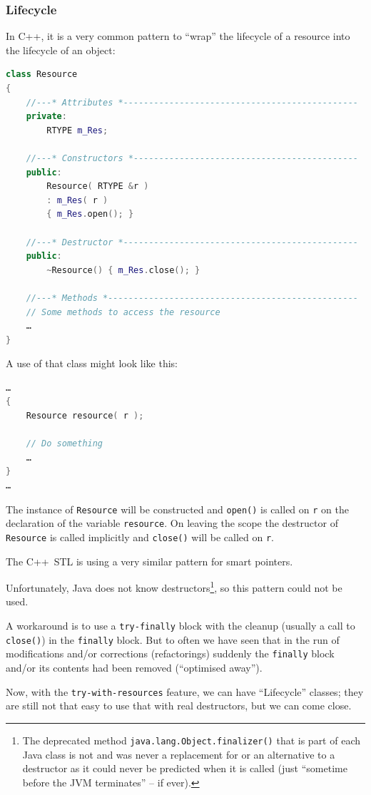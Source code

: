 \documentclass[12pt,a4paper,titlepage, parskip=half, headsepline, footsepline, cleardoubleplain]{scrbook}
\begin{document}
\subsubsection{Lifecycle}\label{sec:Lifecycle}
In C++, it is a very common pattern to “wrap” the lifecycle of a resource into the lifecycle of an object:
\begin{lstlisting}[language=C++]
class Resource
{
    //---* Attributes *----------------------------------------------
    private:
        RTYPE m_Res;

    //---* Constructors *--------------------------------------------
    public:
        Resource( RTYPE &r )
        : m_Res( r )
        { m_Res.open(); }

    //---* Destructor *----------------------------------------------
    public:
        ~Resource() { m_Res.close(); }

    //---* Methods *-------------------------------------------------
    // Some methods to access the resource
    …
}
\end{lstlisting}
A use of that class might look like this:
\begin{lstlisting}[language=c++]
…
{
    Resource resource( r );

    // Do something
    …
}
…
\end{lstlisting}
The instance of \lstinline|Resource| will be constructed and \lstinline|open()| is called on \lstinline|r| on the declaration of the variable \lstinline|resource|. On leaving the scope the destructor of \lstinline|Resource| is called implicitly and \lstinline|close()| will be called on \lstinline|r|.

The C++~STL is using a very similar pattern for smart pointers.

Unfortunately, Java does not know destructors\footnote{The deprecated method \lstinline|java.lang.Object.finalizer()| that is part of each Java class is not and was never a replacement for or an alternative to a destructor as it could never be predicted when it is called (just “sometime before the JVM terminates” – if ever).}, so this pattern could not be used.

A workaround is to use a \lstinline|try-finally| block with the cleanup (usually a call to \lstinline|close()|) in the \lstinline|finally| block. But to often we have seen that in the run of modifications and/or corrections (refactorings) suddenly the \lstinline|finally| block and/or its contents had been removed (“optimised away”).

Now, with the \lstinline|try-with-resources| feature, we can have “Lifecycle” classes; they are still not that easy to use that with real destructors, but we can come close.
\end{document}
